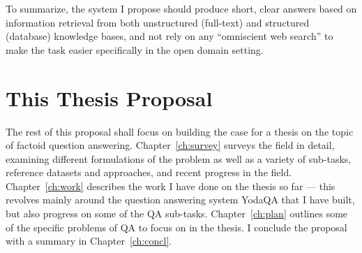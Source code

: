 To summarize, the system I propose should produce short, clear answers
based on information retrieval from both
unstructured (full-text) and structured (database) knowledge bases,
and not rely on any ``omniscient web search'' to make the task easier
specifically in the open domain setting.

\section{This Thesis Proposal}

The rest of this proposal shall focus on building the case for
a thesis on the topic of factoid question answering.
Chapter~\ref{ch:survey}
surveys the field in detail, examining different formulations of the problem
as well as a variety of sub-tasks, reference datasets and approaches,
and recent progress in the field.
Chapter~\ref{ch:work} describes
the work I have done on the thesis so far --- this revolves mainly around
the question answering system YodaQA that I have built, but also progress
on some of the QA sub-tasks.
Chapter~\ref{ch:plan} outlines some of the specific problems of QA
to focus on in the thesis.
I conclude the proposal with a summary in Chapter~\ref{ch:concl}.

